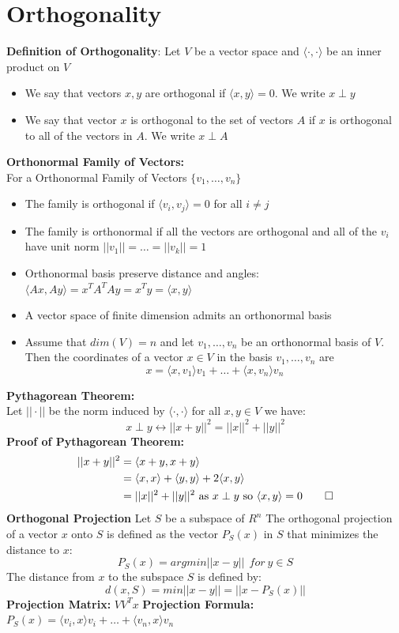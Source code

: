 \documentclass[12pt,twoside]{article}
\begin{document}
\section*{Orthogonality}
\textbf{Definition of Orthogonality}:
Let $V$ be a vector space and $\langle \cdot, \cdot \rangle$ be an inner product on $V$
\begin{itemize}
    \item We say that vectors $x,y$ are orthogonal  if $\langle x,y \rangle = 0$. We write $x \perp y$
    \item We say that vector $x$ is orthogonal to the set of vectors $A$ if $x$ is orthogonal to all of the vectors in $A$. We write $x \perp A$
\end{itemize}
\textbf{Orthonormal Family of Vectors:}\\
For a Orthonormal Family of Vectors $\{v_1,\dots, v_n \}$
\begin{itemize}
    \item The family is orthogonal if $\langle v_i, v_j \rangle =0$ for all $i \neq j$
    \item The family is orthonormal if all the vectors are orthogonal and all of the $v_i$ have unit norm $||v_1|| = \dots = ||v_k|| = 1$
    \item Orthonormal basis preserve distance and angles: $\langle Ax, Ay\rangle = x^TA^TAy = x^Ty = \langle x,y \rangle$
    \item A vector space of finite dimension admits an orthonormal basis
    \item Assume that $dim(V)=n$ and let $v_1, \dots, v_n$ be an orthonormal basis of $V$. Then the coordinates of a vector $x \in V$ in the basis $v_1, \dots, v_n$ are
$$
    x = \langle x, v_1 \rangle v_1 + \dots + \langle x,v_n \rangle v_n 
$$
\end{itemize}
\textbf{Pythagorean Theorem:}\\
Let $||\cdot||$ be the norm induced by $\langle \cdot, \cdot \rangle $ for all $x,y \in V$ we have:
$$
    x \perp y \longleftrightarrow ||x+y||^2 = ||x||^2 + ||y||^2
$$
\textbf{Proof of Pythagorean Theorem:}
\begin{equation}
    \begin{split}
        ||x+y||^2 &= \langle x+y , x+y \rangle  \\
        &= \langle x , x \rangle + \langle y , y \rangle + 2\langle x , y \rangle \\
        &= ||x||^2 + ||y||^2 \text{ as } x \perp y \text{ so } \langle x,y \rangle = 0 \qed
    \end{split}
\end{equation}
\textbf{Orthogonal Projection}
Let $S$ be a subspace of $R^n$ The orthogonal projection of a vector $x$ onto $S$ is defined as the vector $P_S(x)$ in $S$ that minimizes the distance to $x$:
$$
    P_S(x) = argmin ||x-y|| \ \ for \ y\in S
$$
The distance from $x$ to the subspace $S$ is defined by:
$$
    d(x,S) = min||x-y|| = ||x-P_S(x)|| 
$$
\textbf{Projection Matrix:} $VV^Tx$
\textbf{Projection Formula:} $P_S(x) = \langle v_i, x \rangle v_i + \dots + \langle v_n, x \rangle v_n$
\end{document}
